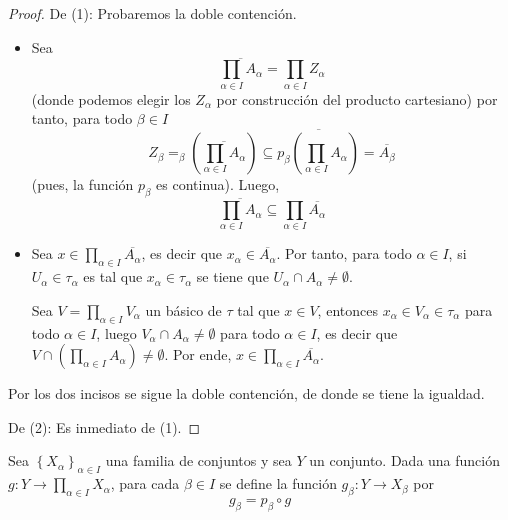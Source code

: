 \documentclass[12pt]{report}
\theoremstyle{largebreak}
\newcommand\cf[3]{\ensuremath{#1:#2\rightarrow#3}}
\newcommand{\Cls}[1]{\ensuremath{\overline{#1}}}
\begin{document}
    \begin{proof}
        De (1): Probaremos la doble contención.
        \begin{itemize}
            \item Sea
            \begin{equation*}
                \Cls{\prod_{\alpha\in I}A_\alpha}=\prod_{\alpha\in I}Z_\alpha
            \end{equation*}
            (donde podemos elegir los $Z_\alpha$ por construcción del producto cartesiano) por tanto, para todo $\beta\in I$
            \begin{equation*}
                Z_\beta=_\beta(\Cls{\prod_{\alpha\in I}A_\alpha})\subseteq\Cls{p_\beta(\prod_{\alpha\in I}A_\alpha)}=\Cls{A_\beta}
            \end{equation*}
            (pues, la función $p_\beta$ es continua). Luego,
            \begin{equation*}
                \Cls{\prod_{\alpha\in I}A_\alpha}\subseteq\prod_{\alpha\in I}\Cls{A_\alpha}
            \end{equation*}
            \item Sea $x\in\prod_{\alpha\in I}\Cls{A_\alpha}$, es decir que $x_\alpha\in\Cls{A_\alpha}$. Por tanto, para todo $\alpha\in I$, si $U_\alpha\in\tau_\alpha$ es tal que $x_\alpha\in\tau_\alpha$ se tiene que $U_\alpha\cap A_\alpha\neq\emptyset$.
            
            Sea $V=\prod_{\alpha\in I}V_\alpha$ un básico de $\tau$ tal que $x\in V$, entonces $x_\alpha\in V_\alpha\in\tau_\alpha$ para todo $\alpha\in I$, luego $V_\alpha\cap A_\alpha\neq\emptyset$ para todo $\alpha\in I$, es decir que $V\cap\left(\prod_{\alpha\in I}A_\alpha\right)\neq\emptyset$. Por ende, $x\in\prod_{\alpha\in I}\Cls{A_\alpha}$.
        \end{itemize}
        Por los dos incisos se sigue la doble contención, de donde se tiene la igualdad.

        De (2): Es inmediato de (1).
    \end{proof}

    \begin{mydef}
        Sea $\left\{X_\alpha \right\}_{\alpha\in I}$ una familia de conjuntos y sea $Y$ un conjunto. Dada una función $\cf{g}{Y}{\prod_{\alpha\in I}X_\alpha}$, para cada $\beta\in I$ se define la función $\cf{g_\beta}{Y}{X_\beta}$ por
        \begin{equation*}
            g_\beta=p_\beta\circ g
        \end{equation*}
    \end{mydef}
\end{document}
